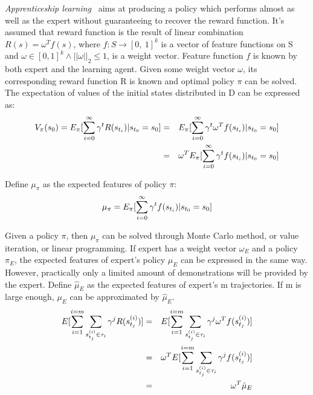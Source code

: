 \emph {Apprenticeship learning}~\cite{Abbeel:2004:ALV:1015330.1015430} aims at producing a policy which performs almost as well as the expert without guaranteeing to recover the reward function. It's assumed that reward function is the result of linear combination $R(s) = \omega^Tf(s)$, where $f:S \to [0,\ 1]^k$ is a vector of feature functions on S and $\omega \in [0, 1]^k \wedge ||\omega||_2\leq 1$, is a weight vector. Feature function $f$ is known by both expert and the learning agent. Given some weight vector $\omega$, its corresponding reward function R is known and optimal policy $\pi$ can be solved. The expectation of values of the initial states distributed in D can be expressed as:
\begin{eqnarray}
\centering
V_{\pi}({s_0}) = E_{\pi}[\sum^{\infty}_{i=0}\gamma^t R(s_{t_i})|s_{t_0}=s_0] &=& E_{\pi}[\sum^{\infty}_{i=0}\gamma^t \omega^Tf(s_{t_i})|s_{t_0}=s_0]\nonumber\\
						&=& \omega^T E_{\pi}[\sum^\infty_{i=0}\gamma^t f(s_{t_i})|s_{t_0}=s_0]
\end{eqnarray}

Define $\mu_{\pi}$ as the expected features of policy $\pi$:
\begin{equation}
\centering
\mu_{\pi} = E_{\pi}[\sum^\infty_{i=0}\gamma^t f(s_{t_i})|s_{t_0}=s_0]
\end{equation}

Given a policy $\pi$, then $\mu_\pi$ can be solved through Monte Carlo method, or value iteration, or linear programming. If expert has a weight vector $\omega_E$ and a policy $\pi_E$, the expected features of expert's policy $\mu_E$ can be expressed in the same way. However, practically only a limited amount of demonstrations will be provided by the expert. Define $\hat{\mu}_E$ as the expected features of expert's m trajectories. If m is large enough, $\mu_E$ can be approximated by $\hat{\mu}_E$.
\begin{eqnarray}
\centering
E[\sum_{i=1}^{i=m}\sum_{s^{(i)}_{t_j}\in \tau_i}\gamma^j R(s^{(i)}_{t_j})] 
&=& E[\sum_{i=1}^{i=m}\sum_{s^{(i)}_{t_j}\in \tau_i}\gamma^j \omega^Tf(s^{(i)}_{t_j})]\nonumber\\ 
&=& \omega^T E[\sum_{i=1}^{i=m}\sum_{s^{(i)}_{t_j}\in \tau_i}\gamma^j f(s^{(i)}_{t_j})]\nonumber\\ 
&=& \omega^T \hat{\mu}_E 
\end{eqnarray}


